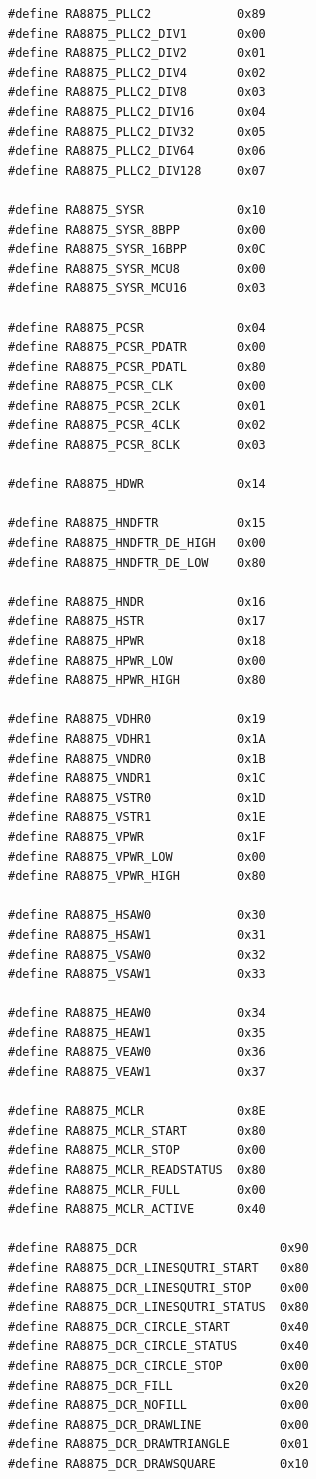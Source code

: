 \documentclass[a4paper, 12pt]{article}
\begin{document}
\begin{verbatim}
#define RA8875_PLLC2            0x89
#define RA8875_PLLC2_DIV1       0x00
#define RA8875_PLLC2_DIV2       0x01
#define RA8875_PLLC2_DIV4       0x02
#define RA8875_PLLC2_DIV8       0x03
#define RA8875_PLLC2_DIV16      0x04
#define RA8875_PLLC2_DIV32      0x05
#define RA8875_PLLC2_DIV64      0x06
#define RA8875_PLLC2_DIV128     0x07

#define RA8875_SYSR             0x10
#define RA8875_SYSR_8BPP        0x00
#define RA8875_SYSR_16BPP       0x0C
#define RA8875_SYSR_MCU8        0x00
#define RA8875_SYSR_MCU16       0x03

#define RA8875_PCSR             0x04
#define RA8875_PCSR_PDATR       0x00
#define RA8875_PCSR_PDATL       0x80
#define RA8875_PCSR_CLK         0x00
#define RA8875_PCSR_2CLK        0x01
#define RA8875_PCSR_4CLK        0x02
#define RA8875_PCSR_8CLK        0x03

#define RA8875_HDWR             0x14

#define RA8875_HNDFTR           0x15
#define RA8875_HNDFTR_DE_HIGH   0x00
#define RA8875_HNDFTR_DE_LOW    0x80

#define RA8875_HNDR             0x16
#define RA8875_HSTR             0x17
#define RA8875_HPWR             0x18
#define RA8875_HPWR_LOW         0x00
#define RA8875_HPWR_HIGH        0x80

#define RA8875_VDHR0            0x19
#define RA8875_VDHR1            0x1A
#define RA8875_VNDR0            0x1B
#define RA8875_VNDR1            0x1C
#define RA8875_VSTR0            0x1D
#define RA8875_VSTR1            0x1E
#define RA8875_VPWR             0x1F
#define RA8875_VPWR_LOW         0x00
#define RA8875_VPWR_HIGH        0x80

#define RA8875_HSAW0            0x30
#define RA8875_HSAW1            0x31
#define RA8875_VSAW0            0x32
#define RA8875_VSAW1            0x33

#define RA8875_HEAW0            0x34
#define RA8875_HEAW1            0x35
#define RA8875_VEAW0            0x36
#define RA8875_VEAW1            0x37

#define RA8875_MCLR             0x8E
#define RA8875_MCLR_START       0x80
#define RA8875_MCLR_STOP        0x00
#define RA8875_MCLR_READSTATUS  0x80
#define RA8875_MCLR_FULL        0x00
#define RA8875_MCLR_ACTIVE      0x40

#define RA8875_DCR                    0x90
#define RA8875_DCR_LINESQUTRI_START   0x80
#define RA8875_DCR_LINESQUTRI_STOP    0x00
#define RA8875_DCR_LINESQUTRI_STATUS  0x80
#define RA8875_DCR_CIRCLE_START       0x40
#define RA8875_DCR_CIRCLE_STATUS      0x40
#define RA8875_DCR_CIRCLE_STOP        0x00
#define RA8875_DCR_FILL               0x20
#define RA8875_DCR_NOFILL             0x00
#define RA8875_DCR_DRAWLINE           0x00
#define RA8875_DCR_DRAWTRIANGLE       0x01
#define RA8875_DCR_DRAWSQUARE         0x10


\end{verbatim}
\end{document}
